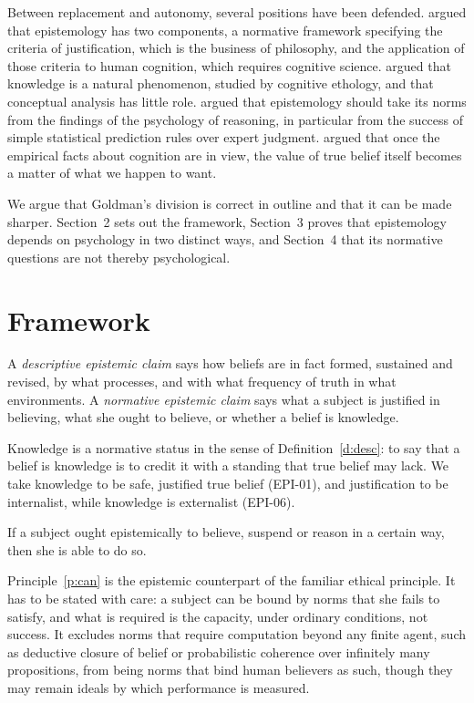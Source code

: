 \documentclass{situationist-preprint}
\begin{document}
Between replacement and autonomy, several positions have been defended. \citet{Goldman1986} argued that epistemology has two components, a normative framework specifying the criteria of justification, which is the business of philosophy, and the application of those criteria to human cognition, which requires cognitive science. \citet{Kornblith2002} argued that knowledge is a natural phenomenon, studied by cognitive ethology, and that conceptual analysis has little role. \citet{BishopTrout2005} argued that epistemology should take its norms from the findings of the psychology of reasoning, in particular from the success of simple statistical prediction rules over expert judgment. \citet{Stich1990} argued that once the empirical facts about cognition are in view, the value of true belief itself becomes a matter of what we happen to want.

We argue that Goldman's division is correct in outline and that it can be made sharper. Section~2 sets out the framework, Section~3 proves that epistemology depends on psychology in two distinct ways, and Section~4 that its normative questions are not thereby psychological.

\section{Framework}

\begin{definition}\label{d:desc}
A \emph{descriptive epistemic claim} says how beliefs are in fact formed, sustained and revised, by what processes, and with what frequency of truth in what environments. A \emph{normative epistemic claim} says what a subject is justified in believing, what she ought to believe, or whether a belief is knowledge.
\end{definition}

Knowledge is a normative status in the sense of Definition~\ref{d:desc}: to say that a belief is knowledge is to credit it with a standing that true belief may lack. We take knowledge to be safe, justified true belief (EPI-01), and justification to be internalist, while knowledge is externalist (EPI-06).

\begin{principle}\label{p:can}
If a subject ought epistemically to believe, suspend or reason in a certain way, then she is able to do so.
\end{principle}

Principle~\ref{p:can} is the epistemic counterpart of the familiar ethical principle. It has to be stated with care: a subject can be bound by norms that she fails to satisfy, and what is required is the capacity, under ordinary conditions, not success. It excludes norms that require computation beyond any finite agent, such as deductive closure of belief or probabilistic coherence over infinitely many propositions, from being norms that bind human believers as such, though they may remain ideals by which performance is measured.
\end{document}
